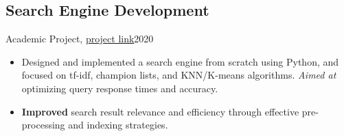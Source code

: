 \subsection{Search Engine Development}{Academic Project, \href{https://github.com/Danial-Kord/Information_Retrieval_Search_Engine}{project link}}{2020}
\begin{itemize}
    \item Designed and implemented a search engine from scratch using Python, and focused on tf-idf, champion lists, and KNN/K-means algorithms. \emph{Aimed at} optimizing query response times and accuracy.
    \item \textbf{Improved} search result relevance and efficiency through effective pre-processing and indexing strategies.
\end{itemize}
